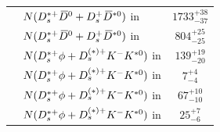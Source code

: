 \begin{longtable}{ l l c }
           & $N({{D}^{*+}_{s}}{{\kern 0.2em\overline{\kern -0.2em D}{}}{}^0} + {{D}^+_{s}}{{\kern 0.2em\overline{\kern -0.2em D}{}}{}^{*0}})$ in \decay{\Dsp}{\phiz\pip}                     &   $1733^{+38}_{-37} $\\
           & $N({{D}^{*+}_{s}}{{\kern 0.2em\overline{\kern -0.2em D}{}}{}^0} + {{D}^+_{s}}{{\kern 0.2em\overline{\kern -0.2em D}{}}{}^{*0}})$ in \decay{\Dsp}{\pip\pim\pip}                  &   $804^{+25}_{-25} $\\
           & $N({{D}^{*+}_{s}}\phi + D_{s}^{(*)+}{{K}^-}{{K}^{*0}})$ in \decay{\Dsp}{\Kp\Km\pip}         &   $139^{+19}_{-20} $\\
           & $N({{D}^{*+}_{s}}\phi + D_{s}^{(*)+}{{K}^-}{{K}^{*0}})$ in \decay{\Dsp}{\Kp\pim\pip}        &   $7^{+4}_{-4} $\\
           & $N({{D}^{*+}_{s}}\phi + D_{s}^{(*)+}{{K}^-}{{K}^{*0}})$ in \decay{\Dsp}{\phiz\pip}          &   $67^{+10}_{-10} $\\
           & $N({{D}^{*+}_{s}}\phi + D_{s}^{(*)+}{{K}^-}{{K}^{*0}})$ in \decay{\Dsp}{\Kp\pim\pip}        &   $25^{+7}_{-6} $\\


\end{longtable}
